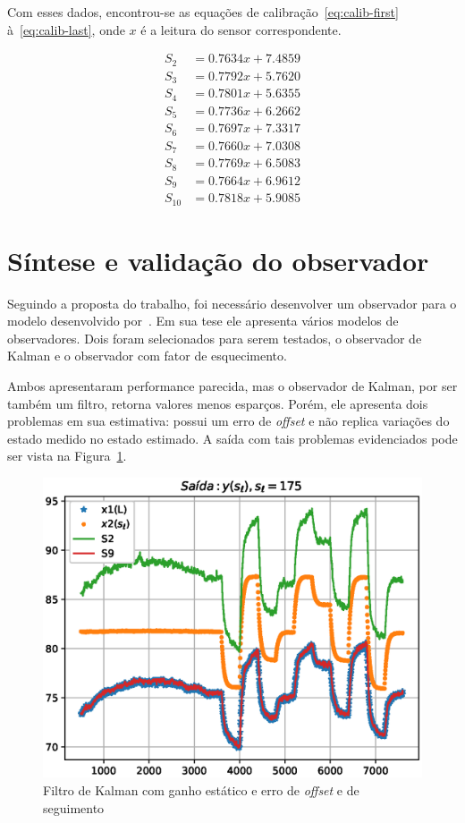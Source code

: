 Com esses dados, encontrou-se as equações de calibração~\eqref{eq:calib-first}
à~\eqref{eq:calib-last}, onde \(x\) é a leitura do sensor correspondente.

\begin{align}
	\label{eq:calib-first}
	S_2    & = 0.7634x + 7.4859 \\
	S_3    & = 0.7792x + 5.7620 \\
	S_4    & = 0.7801x + 5.6355 \\
	S_5    & = 0.7736x + 6.2662 \\
	S_6    & = 0.7697x + 7.3317 \\
	S_7    & = 0.7660x + 7.0308 \\
	S_8    & = 0.7769x + 6.5083 \\
	S_9    & = 0.7664x + 6.9612 \\
	\label{eq:calib-last}
	S_{10} & = 0.7818x + 5.9085
\end{align}

\section{Síntese e validação do observador}%
\label{sec:validation}

Seguindo a proposta do trabalho, foi necessário desenvolver um observador para o
modelo desenvolvido por~\textcite{masterthesis:nelson}. Em sua tese ele
apresenta vários modelos de observadores. Dois foram selecionados para serem
testados, o observador de Kalman e o observador com fator de esquecimento.

Ambos apresentaram performance parecida, mas o observador de Kalman, por ser
também um filtro, retorna valores menos esparços. Porém, ele apresenta dois
problemas em sua estimativa: possui um erro de \textit{offset} e não replica
variações do estado medido no estado estimado. A saída com tais problemas
evidenciados pode ser vista na Figura~\ref{fig:kalman-estatico}.

\begin{figure}[ht!]
	\centering
	\captionsetup{justification=centering}
	\includegraphics[height=0.5\linewidth]{imgs/kalman-estatico}
	\caption{Filtro de Kalman com ganho estático e erro de \textit{offset} e de seguimento}%
	\label{fig:kalman-estatico}
\end{figure}

